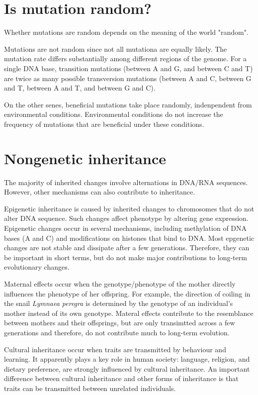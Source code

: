 \documentclass[11pt]{article}
\begin{document}
\begin{sloppypar}
\section{Is mutation random?}
Whether mutations are random depends on the meaning of the world "random". 

\par

Mutations are not random since not all mutationa are equally likely. 
The mutation rate differs substantially among different regions of the genome. 
For a single DNA base, transition mutations (between A and G, and between C and T) are twice as many possible transversion mutations (between A and C, between G and T, between A and T, and between G and C). 

\par

On the other senes, beneficial mutations take place randomly, indenpendent from environmental conditions. 
Environmental conditions do not increase the frequency of mutations that are beneficial under these conditions. 

\section{Nongenetic inheritance}
The majority of inherited changes involve alternations in DNA/RNA sequences. 
However, other mechanisms can also contribute to inheritance. 

\par

Epigenetic inheritance is caused by inherited changes to chromosomes that do not alter DNA sequence. 
Such changes affect phenotype by altering gene expression. 
Epigenetic changes occur in several mechanisms, including methylation of DNA bases (A and C) and modifications on histones that bind to DNA. 
Most epgenetic changes are not stable and dissipate after a few generations. 
Therefore, they can be important in short terms, but do not make major contributions to long-term evolutionary changes. 

\par

Maternal effects occur when the genotype/phenotype of the mother directly influences the phenotype of her offspring. 
For example, the direction of coiling in the snail \textit{Lymnaea peregra} is determined by the genotype of an individual's mother instead of its own genotype. 
Materal effects contribute to the resemblance between mothers and their offsprings, but are only transimtted across a few generations and therefore, do not contribute much to long-term evolution. 

\par

Cultural inheritance occur when traits are transmitted by behaviour and learning. 
It apparently plays a key role in human society: language, religion, and dietary preference, are strongly influenced by cultural inheritance. 
An important difference between cultural inheritance and other forms of inheritance is that traits can be transmitted between unrelated individuals. 

\end{sloppypar}
\end{document}

